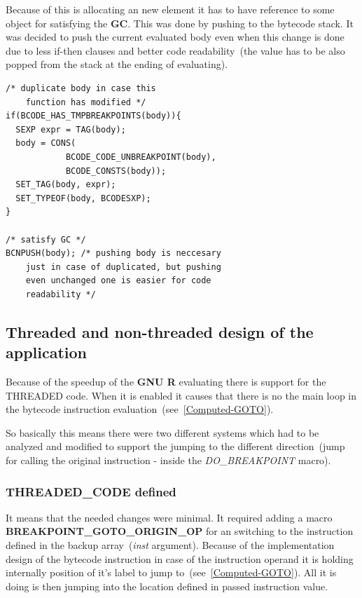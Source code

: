 \documentclass[thesis=M,english]{FITthesis}[2018/10/20]
\begin{document}
Because of this is allocating an new element it has to have reference to some object for satisfying the \textbf{GC}. This was done by pushing to the bytecode stack. It was decided to push the current evaluated body even when this change is done due to less if-then clauses and better code readability~(the value has to be also popped from the stack at the ending of evaluating).

\begin{lstlisting}
/* duplicate body in case this 
	function has modified */
if(BCODE_HAS_TMPBREAKPOINTS(body)){
  SEXP expr = TAG(body);
  body = CONS(
            BCODE_CODE_UNBREAKPOINT(body), 
            BCODE_CONSTS(body));
  SET_TAG(body, expr);
  SET_TYPEOF(body, BCODESXP);
}

/* satisfy GC */
BCNPUSH(body); /* pushing body is neccesary 
	just in case of duplicated, but pushing 
	even unchanged one is easier for code
    readability */

\end{lstlisting}

\subsection{Threaded and non-threaded design of the application}

Because of the speedup of the \textbf{GNU R} evaluating there is support for the THREADED code. When it is enabled it causes that there is no the main loop in the bytecode instruction evaluation~(see~\ref{Computed-GOTO}). 

So basically this means there were two different systems which had to be analyzed and modified to support the jumping to the different direction~(jump for calling the original instruction - inside the \textit{DO{\_}BREAKPOINT} macro).

\subsubsection{THREADED{\_}CODE defined}
It means that the needed changes were minimal. It required adding a macro \textbf{BREAKPOINT{\_}GOTO{\_}ORIGIN{\_}OP} for an switching to the instruction defined in the backup array~(\textit{inst} argument). Because of the implementation design of the bytecode instruction in case of the instruction operand it is holding internally position of it's label to jump to~(see~\ref{Computed-GOTO}). All it is doing is then jumping into the location defined in passed instruction value.
\end{document}
